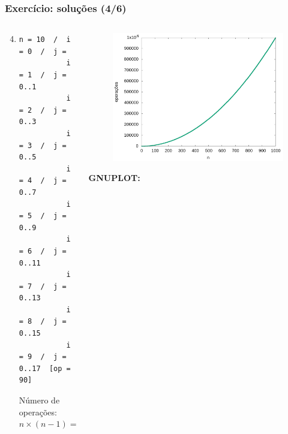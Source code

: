 \documentclass[aspectratio=169]{beamer}
\begin{document}

\begin{frame}[fragile]\frametitle{Exercício: soluções (4/6)}
\begin{columns}[T]
\begin{column}{0.5\linewidth}
\begin{enumerate}
	\setcounter{enumi}{3}
	\item {\scriptsize}
{\tiny
\begin{verbatim}
n = 10  /  i = 0  /  j = 
           i = 1  /  j = 0..1
           i = 2  /  j = 0..3
           i = 3  /  j = 0..5
           i = 4  /  j = 0..7
           i = 5  /  j = 0..9
           i = 6  /  j = 0..11
           i = 7  /  j = 0..13
           i = 8  /  j = 0..15
           i = 9  /  j = 0..17  [op = 90]
\end{verbatim}
Número de operações: $n \times (n-1) = n^2 - n \therefore O(n^2)$
}
\end{enumerate}
\end{column}
\begin{column}{0.5\linewidth}
\begin{figure}[h]
	\centering
	\includegraphics[height=0.5\paperheight]{contagem/contagem04.jpg}
\end{figure}
{\fontsize{0}{4}\selectfont{}\textbf{GNUPLOT:}

}
\end{column}
\end{columns}
\end{frame}
\end{document}
